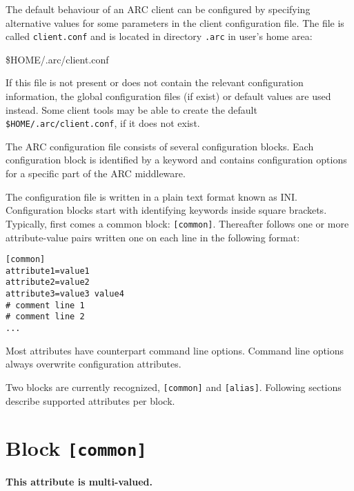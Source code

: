 The default behaviour of an ARC client can be configured by specifying
alternative values for some parameters in the client configuration
file. The file is called \texttt{client.conf} and is located in
directory \texttt{.arc} in user's home area:
\begin{shaded}
 {\$}HOME/.arc/client.conf
\end{shaded}
If this file is not present or does not contain the relevant
configuration information, the global configuration files (if exist)
or default values are used instead. Some client tools may be able to create
the default \texttt{{\$}HOME/.arc/client.conf}, if it does not exist.

The ARC configuration file consists of several configuration blocks.
Each configuration block is identified by a keyword and contains
configuration options for a specific part of the ARC middleware.

The configuration file is written in a plain text format known as INI.
Configuration blocks start with identifying keywords inside square brackets.
Typically, first comes a common block: \verb#[common]#. Thereafter follows one
or more attribute-value pairs written one on each line in the following
format:

\begin{framed}
\begin{verbatim}
[common]
attribute1=value1
attribute2=value2
attribute3=value3 value4
# comment line 1
# comment line 2
...
\end{verbatim}
\end{framed}


Most attributes have counterpart command line options. Command line options
always overwrite configuration attributes.

Two blocks are currently recognized, \texttt{[common]} and
\texttt{[alias]}. Following sections describe supported attributes per block.

\section{Block \texttt{[common]}}

{}
\hspace*{0.5cm}
\begin{shaded}
\end{shaded}
\textbf{This attribute is multi-valued.}

